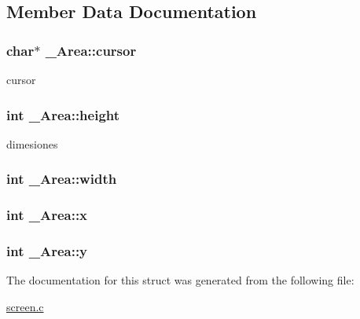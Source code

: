 \subsection{Member Data Documentation}
\hypertarget{struct__Area_aa042b0549789b75fd133b67ad7d0fd9d}{
\subsubsection[{cursor}]{\setlength{\rightskip}{0pt plus 5cm}char$\ast$ \+\_\+\+Area\+::cursor}}\label{struct__Area_aa042b0549789b75fd133b67ad7d0fd9d}
cursor \hypertarget{struct__Area_a22627de8e529d631c17157f1f68cb5ac}{
\subsubsection[{height}]{\setlength{\rightskip}{0pt plus 5cm}int \+\_\+\+Area\+::height}}\label{struct__Area_a22627de8e529d631c17157f1f68cb5ac}
dimesiones \hypertarget{struct__Area_aa2f753fc3d254821603ac4512db814f1}{
\subsubsection[{width}]{\setlength{\rightskip}{0pt plus 5cm}int \+\_\+\+Area\+::width}}\label{struct__Area_aa2f753fc3d254821603ac4512db814f1}
\hypertarget{struct__Area_a093b8c2929094bac88bbf5ee7db85573}{
\subsubsection[{x}]{\setlength{\rightskip}{0pt plus 5cm}int \+\_\+\+Area\+::x}}\label{struct__Area_a093b8c2929094bac88bbf5ee7db85573}
\hypertarget{struct__Area_a867e601f05480db03237c3a17d4c77f8}{
\subsubsection[{y}]{\setlength{\rightskip}{0pt plus 5cm}int \+\_\+\+Area\+::y}}\label{struct__Area_a867e601f05480db03237c3a17d4c77f8}


The documentation for this struct was generated from the following file\+:\begin{DoxyCompactItemize}
\item 
\hyperlink{screen_8c}{screen.\+c}\end{DoxyCompactItemize}

